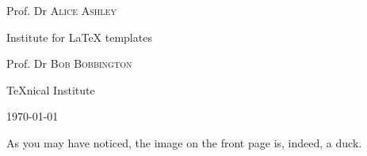 \documentclass{scripts/preamble}
\begin{document}
\begin{titlepage}
        {\large Prof. Dr \textsc{Alice Ashley}\par}%
	    Institute for \LaTeX{} templates\par%
	    \vspace{0.25cm}
	    {\large Prof. Dr \textsc{Bob Bobbington}\par}%
	    \TeX nical Institute\par%
	    \vspace{0.25cm}
		\vfill
		{\large \today\par}%
	    
	\end{titlepage}    
	\restoregeometry
	\clearpage
	\thispagestyle{empty}
	\null\vfill\strut
	As you may have noticed, the image on the front page is, indeed, a duck.
\end{document}
